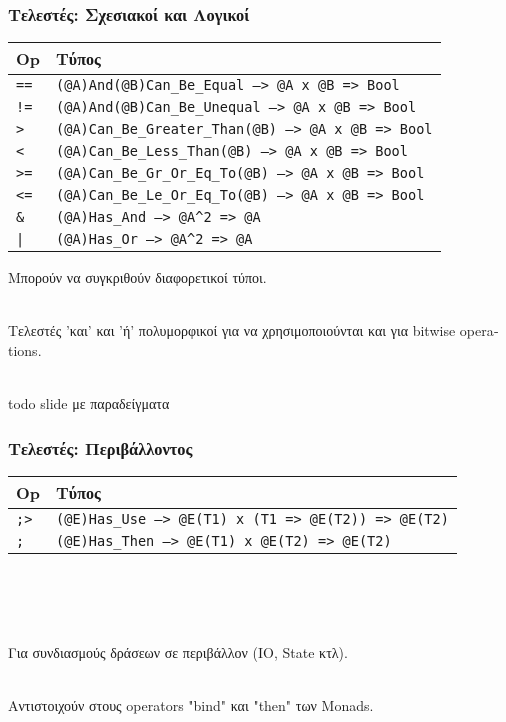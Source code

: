 \documentclass{beamer}
\def\e{\foreignlanguage{english}}
\begin{document}
\begin{frame}[fragile]

\frametitle{Τελεστές: Σχεσιακοί και Λογικοί}

\begin{center}
\begin{tabular}{ |P{0.8cm}|P{9.4cm}| }
 \hline
 \e{Op} & Τύπος
 \\
 \hline
 \e{\texttt{==}} & \e{\texttt{(@A)And(@B)Can\_Be\_Equal --> @A x @B => Bool}}
 \\
 \e{\texttt{!=}} & \e{\texttt{(@A)And(@B)Can\_Be\_Unequal --> @A x @B => Bool}}
 \\
 \e{\texttt{>}} & \e{\texttt{(@A)Can\_Be\_Greater\_Than(@B) --> @A x @B => Bool}}
 \\
 \e{\texttt{<}} & \e{\texttt{(@A)Can\_Be\_Less\_Than(@B) --> @A x @B => Bool}}
 \\
 \e{\texttt{>=}} & \e{\texttt{(@A)Can\_Be\_Gr\_Or\_Eq\_To(@B) --> @A x @B => Bool}}
 \\
 \e{\texttt{<=}} & \e{\texttt{(@A)Can\_Be\_Le\_Or\_Eq\_To(@B) --> @A x @B => Bool}}
 \\
 \e{\texttt{\&}} & \e{\texttt{(@A)Has\_And --> @A}\texttt{\^}\texttt{2 => @A}}
 \\
 \e{\texttt{|}} & \e{\texttt{(@A)Has\_Or --> @A}\texttt{\^}\texttt{2 => @A}}
 \\
 \hline
\end{tabular}
\end{center}

Μπορούν να συγκριθούν διαφορετικοί τύποι.
\\~\

Τελεστές 'και' και 'ή' πολυμορφικοί για να χρησιμοποιούνται και για
\e{bitwise operations}.
\\~\

\e{todo slide} με παραδείγματα
\end{frame}

\begin{frame}

\frametitle{Τελεστές: Περιβάλλοντος}

\begin{center}
\begin{tabular}{ |P{0.4cm}|P{9.9cm}| }
 \hline
 \e{Op} & Τύπος
 \\
 \hline
 \e{\texttt{;>}} & \e{\texttt{(@E)Has\_Use --> @E(T1) x (T1 => @E(T2)) => @E(T2)}}
 \\
 \e{\texttt{;}} & \e{\texttt{(@E)Has\_Then --> @E(T1) x @E(T2) => @E(T2)}}
 \\
 \hline
\end{tabular}
\\~\
\\~\
\end{center}

Για συνδιασμούς δράσεων σε περιβάλλον (\e{IO, State} κτλ).
\\~\

Αντιστοιχούν στους \e{operators "bind"} και \e{"then"} των \e{Monads}.

\end{frame}
\end{document}
